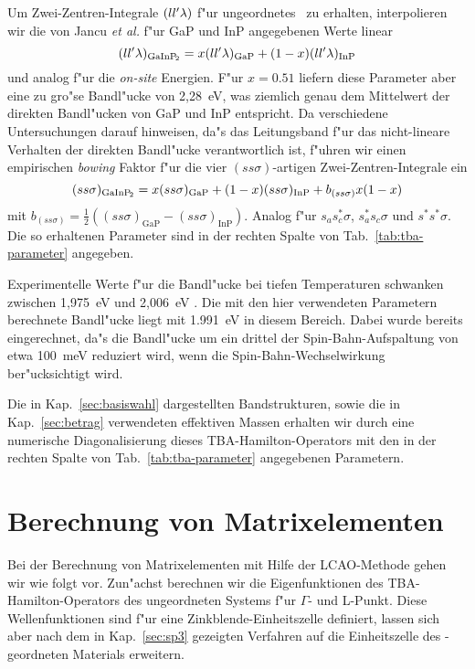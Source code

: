 Um Zwei-Zentren-Integrale $(ll^{\prime}\lambda)$ f"ur ungeordnetes \GaInP\ zu
erhalten, interpolieren wir die von Jancu \emph{et al.} \cite{jsbb:98} f"ur
GaP und InP angegebenen Werte linear
%
\begin{displaymath}
  (ll^{\prime}\lambda)_{\text{GaInP}_{\! 2}} = x (ll^{\prime}\lambda)_{\mathrm{GaP}} + (1-x) (ll^{\prime}\lambda)_{\mathrm{InP}}
\end{displaymath}
%
und analog f"ur die \emph{on-site} Energien. F"ur $x=0.51$ liefern diese
Parameter aber eine zu gro"se Bandl"ucke von 2,28~eV, was ziemlich genau dem
Mittelwert der direkten Bandl"ucken von GaP und InP entspricht. Da
verschiedene Untersuchungen \cite{LB17a} darauf hinweisen, da"s das
Leitungsband f"ur das nicht-lineare Verhalten der direkten Bandl"ucke
verantwortlich ist, f"uhren wir einen empirischen \emph{bowing} Faktor
f"ur die vier $(ss\sigma)$-artigen Zwei-Zentren-Integrale ein
%
\begin{displaymath}
  (ss\sigma)_{\text{GaInP}_{\! 2}} = x (ss\sigma)_{\mathrm{GaP}} + (1-x)
  (ss\sigma)_{\mathrm{InP}} + b_{(ss\sigma)} x(1-x)
\end{displaymath}
%
mit $b_{(ss\sigma)} =
\frac{1}{2}((ss\sigma)_{\mathrm{GaP}}-(ss\sigma)_{\mathrm{InP}})$. 
Analog f"ur $s_{a}s_{c}^{\ast}\sigma$, $s_{a}^{\ast}s_{c}\sigma$ und
$s^{\ast}s^{\ast}\sigma$. Die so erhaltenen Parameter sind in der rechten
Spalte von Tab.~\ref{tab:tba-parameter} angegeben.

Experimentelle Werte f"ur die Bandl"ucke bei tiefen Temperaturen schwanken
zwischen 1,975~eV und 2,006~eV \cite{kipp:97,fgmz:98}. Die mit den hier
verwendeten Parametern berechnete Bandl"ucke liegt mit 1.991~eV in diesem
Bereich. Dabei wurde bereits eingerechnet, da"s die Bandl"ucke um ein drittel
der Spin-Bahn-Aufspaltung von etwa 100~meV reduziert wird, wenn die
Spin-Bahn-Wechselwirkung ber"ucksichtigt wird.

Die in Kap.~\ref{sec:basiswahl} dargestellten Bandstrukturen, sowie die in
Kap.~\ref{sec:betrag} verwendeten effektiven Massen erhalten wir durch eine
numerische Diagonalisierung dieses TBA-Hamilton-Operators mit den in der
rechten Spalte von Tab.~\ref{tab:tba-parameter} angegebenen Parametern.


\section{Berechnung von Matrixelementen}
\label{sec:me-berechnung}

Bei der Berechnung von Matrixelementen mit Hilfe der LCAO-Methode gehen wir
wie folgt vor. Zun"achst berechnen wir die Eigenfunktionen des
TBA-Hamilton-Operators des ungeordneten Systems f"ur $\Gamma$- und L-Punkt.
Diese Wellenfunktionen sind f"ur eine Zinkblende-Einheitszelle definiert,
lassen sich aber nach dem in Kap.~\ref{sec:sp3} gezeigten Verfahren auf die
Einheitszelle des \CuPt-geordneten Materials erweitern.


